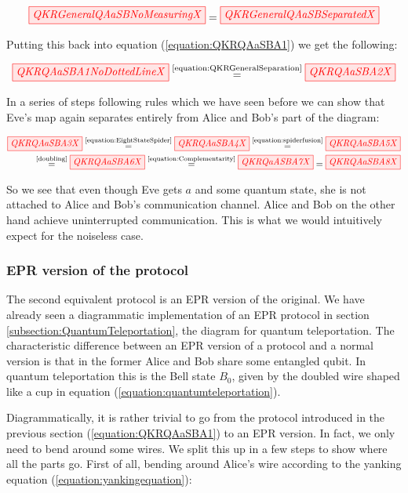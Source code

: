 \documentclass[]{article}
\newcommand{\equaltext}[1]{\ensuremath{\stackrel{\text{#1}}{=}}}
\begin{document}
\begin{equation}
	\label{equation:QKRGeneralSeparation}
	\tikzfig{QKRGeneralQAaSBNoMeasuringX} = \tikzfig{QKRGeneralQAaSBSeparatedX}
\end{equation}

Putting this back into equation (\ref{equation:QKRQAaSBA1}) we get the following:

\begin{equation}
	\tikzfig{QKRQAaSBA1NoDottedLineX} \equaltext{\ref{equation:QKRGeneralSeparation}} \tikzfig{QKRQAaSBA2X}
\end{equation}

In a series of steps following rules which we have seen before we can show that Eve's map again separates entirely from Alice and Bob's part of the diagram:

\begin{equation}
	\begin{aligned}
	\tikzfig{QKRQAaSBA3X} \equaltext{\ref{equation:EightStateSpider}} \tikzfig{QKRQAaSBA4X} \equaltext{\ref{equation:spiderfusion}} \tikzfig{QKRQAaSBA5X} \\ \equaltext{\ref{doubling}} \tikzfig{QKRQAaSBA6X} \equaltext{\ref{equation:Complementarity}} \tikzfig{QKRQaASBA7X} = \tikzfig{QKRQAaSBA8X}
	\end{aligned}
\end{equation}

So we see that even though Eve gets $a$ and some quantum state, she is not attached to Alice and Bob's communication channel. Alice and Bob on the other hand achieve uninterrupted communication. This is what we would intuitively expect for the noiseless case.

\subsubsection{EPR version of the protocol}

\label{section:eprqkr}
The second equivalent protocol is an EPR version of the original. We have already seen a diagrammatic implementation of an EPR protocol in section \ref{subsection:QuantumTeleportation}, the diagram for quantum teleportation. The characteristic difference between an EPR version of a protocol and a normal version is that in the former Alice and Bob share some entangled qubit. In quantum teleportation this is the Bell state $B_0$, given by the doubled wire shaped like a cup in equation (\ref{equation:quantumteleportation}).

Diagrammatically, it is rather trivial to go from the protocol introduced in the previous section (\ref{equation:QKRQAaSBA1}) to an EPR version. In fact, we only need to bend around some wires. We split this up in a few steps to show where all the parts go. First of all, bending around Alice's wire according to the yanking equation (\ref{equation:yankingequation}):
\end{document}
